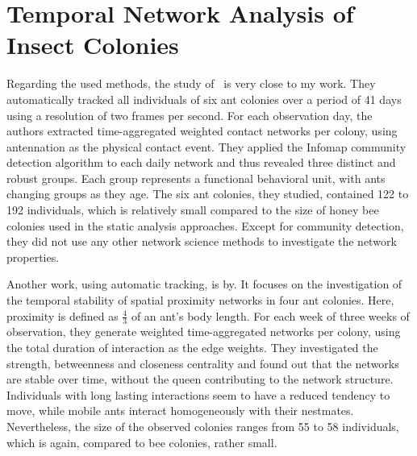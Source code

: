\section{Temporal Network Analysis of Insect Colonies}

Regarding the used methods, the study of~\textcite{mersch2013tracking} is very close to my work.
They automatically tracked all individuals of six ant colonies over a period of 41 days using a resolution of two frames per second.
For each observation day, the authors extracted time-aggregated weighted contact networks per colony, using antennation as the physical contact event.
They applied the Infomap community detection algorithm to each daily network and thus revealed three distinct and robust groups.
Each group represents a functional behavioral unit, with ants changing groups as they age.
The six ant colonies, they studied, contained 122 to 192 individuals, which is relatively small compared to the size of honey bee colonies used in the static analysis approaches.
Except for community detection, they did not use any other network science methods to investigate the network properties.


Another work, using automatic tracking, is by\textcite{jeanson2012long}.
It focuses on the investigation of the temporal stability of spatial proximity networks in four ant colonies.
Here, proximity is defined as $\frac{4}{3}$ of an ant’s body length.
For each week of three weeks of observation, they generate weighted time-aggregated networks per colony,  using the total duration of interaction as the edge weights.
They investigated the strength, betweenness and closeness centrality and found out that the networks are stable over time, without the queen contributing to the network structure.
Individuals with long lasting interactions seem to have a reduced tendency to move, while mobile ants interact homogeneously with their nestmates.
Nevertheless, the size of the observed colonies ranges from 55 to 58 individuals, which is again, compared to bee colonies, rather small.


